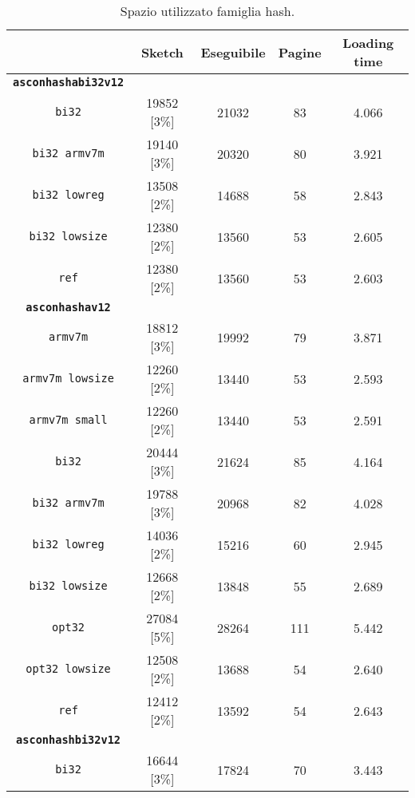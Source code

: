 \begin{table}[h]
    \caption{Spazio utilizzato famiglia hash.}
    \centering
    \begin{adjustbox}{width=205pt}
	\begin{tabular}{|c|c|c|c|c|}
		\hline
         & \textbf{Sketch} & \textbf{Eseguibile} & \textbf{Pagine} & \textbf{Loading time} \\
        \hline
        \texttt{\textbf{asconhashabi32v12}} & & & & \\
        \hline
        \texttt{bi32} & 19852 [3\%] & 21032 & 83 & 4.066 \\
        \hline
        \texttt{bi32 armv7m} & 19140 [3\%] & 20320 & 80 & 3.921 \\
        \hline
        \texttt{bi32 lowreg} & 13508 [2\%] & 14688 & 58 & 2.843 \\
        \hline
        \texttt{bi32 lowsize} & 12380 [2\%] & 13560 & 53 & 2.605 \\
        \hline
        \texttt{ref} & 12380 [2\%] & 13560 & 53 & 2.603 \\
        \hline
        \texttt{\textbf{asconhashav12}} & & & & \\
        \hline
        \texttt{armv7m} & 18812 [3\%] & 19992 & 79 & 3.871 \\
        \hline
        \texttt{armv7m lowsize} & 12260 [2\%] & 13440 & 53 & 2.593 \\
        \hline
        \texttt{armv7m small} & 12260 [2\%] & 13440 & 53 & 2.591 \\
        \hline
        \texttt{bi32} & 20444 [3\%] & 21624 & 85 & 4.164 \\
        \hline
        \texttt{bi32 armv7m} & 19788 [3\%] & 20968 & 82 & 4.028 \\
        \hline
        \texttt{bi32 lowreg} & 14036 [2\%] & 15216 & 60 & 2.945 \\
        \hline
        \texttt{bi32 lowsize} & 12668 [2\%] & 13848 & 55 & 2.689 \\
        \hline
        \texttt{opt32} & 27084 [5\%] & 28264 & 111 & 5.442 \\
        \hline
        \texttt{opt32 lowsize} & 12508 [2\%] & 13688 & 54 & 2.640 \\
        \hline
        \texttt{ref} & 12412 [2\%] & 13592 & 54 & 2.643 \\
        \hline
        \texttt{\textbf{asconhashbi32v12}} & & & & \\
        \hline
        \texttt{bi32} & 16644 [3\%] & 17824 & 70 & 3.443 \\

\end{tabular}
\end{adjustbox}
\end{table}
